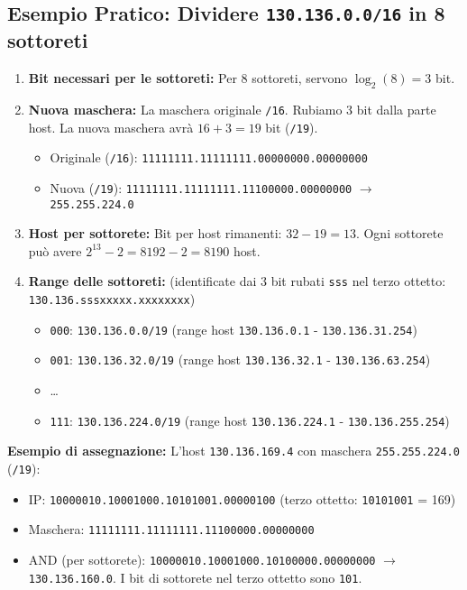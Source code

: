 \subsection{Esempio Pratico: Dividere \texttt{130.136.0.0/16} in 8 sottoreti}
\begin{enumerate}
    \item \textbf{Bit necessari per le sottoreti:} Per 8 sottoreti, servono $\log_2(8) = 3$ bit.
    \item \textbf{Nuova maschera:} La maschera originale \texttt{/16}. Rubiamo 3 bit dalla parte host. La nuova maschera avrà $16 + 3 = 19$ bit (\texttt{/19}).
    \begin{itemize}
        \item Originale (\texttt{/16}): \texttt{11111111.11111111.00000000.00000000}
        \item Nuova (\texttt{/19}): \texttt{11111111.11111111.11100000.00000000} $\rightarrow$ \texttt{255.255.224.0}
    \end{itemize}
    \item \textbf{Host per sottorete:} Bit per host rimanenti: $32 - 19 = 13$.
    Ogni sottorete può avere $2^{13} - 2 = 8192 - 2 = 8190$ host.
    \item \textbf{Range delle sottoreti:} (identificate dai 3 bit rubati \texttt{sss} nel terzo ottetto: \texttt{130.136.sssxxxxx.xxxxxxxx})
    \begin{itemize}
        \item \texttt{000}: \texttt{130.136.0.0/19} (range host \texttt{130.136.0.1} - \texttt{130.136.31.254})
        \item \texttt{001}: \texttt{130.136.32.0/19} (range host \texttt{130.136.32.1} - \texttt{130.136.63.254})
        \item \dots
        \item \texttt{111}: \texttt{130.136.224.0/19} (range host \texttt{130.136.224.1} - \texttt{130.136.255.254})
    \end{itemize}
\end{enumerate}
\textbf{Esempio di assegnazione:} L'host \texttt{130.136.169.4} con maschera \texttt{255.255.224.0} (\texttt{/19}):
\begin{itemize}
    \item IP: \texttt{10000010.10001000.10101001.00000100} (terzo ottetto: \texttt{10101001} = 169)
    \item Maschera: \texttt{11111111.11111111.11100000.00000000}
    \item AND (per sottorete): \texttt{10000010.10001000.10100000.00000000} $\rightarrow$ \texttt{130.136.160.0}.
    I bit di sottorete nel terzo ottetto sono \texttt{101}.
\end{itemize}


